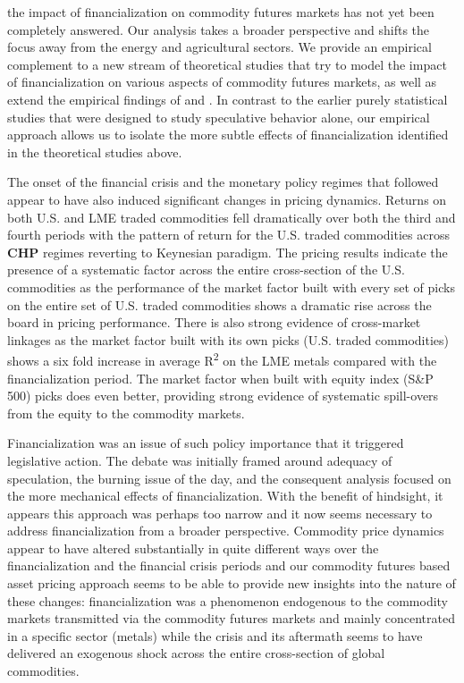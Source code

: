 \documentclass[11pt, letterpaper, doublespacing]{article}
\renewcommand{\footnote}{\endnote}
\let\rmarkdownfootnote\footnote%
\def\footnote{\protect\rmarkdownfootnote}
\begin{document}
the impact of financialization on commodity futures markets has not yet
been completely answered. Our analysis takes a broader perspective and
shifts the focus away from the energy and agricultural sectors. We
provide an empirical complement to a new stream of theoretical studies
that try to model the impact of financialization on various aspects of
commodity futures markets\footnote{\citet{etula_broker-dealer_2013},
  \citet{acharya_limits_2013}, \citet{cheng_convective_2014},
  \citet{leclercq_equilibrium_2014}, \citet{sockin_informational_2015},
  \citet{goldstein_speculation_2013},
  \citet{EkelandSpeculationcommodityfutures2016},
  \citet{goldstein_commodity_2017}.}, as well as extend the empirical
findings of \citet{basak_model_2016} and \citet{tang_index_2012}. In
contrast to the earlier purely statistical studies that were designed to
study speculative behavior alone, our empirical approach allows us to
isolate the more subtle effects of financialization identified in the
theoretical studies above.

The onset of the financial crisis and the monetary policy regimes that
followed appear to have also induced significant changes in pricing
dynamics. Returns on both U.S. and LME traded commodities fell
dramatically over both the third and fourth periods with the pattern of
return for the U.S. traded commodities across \(\mathbf{CHP}\) regimes
reverting to Keynesian paradigm. The pricing results indicate the
presence of a systematic factor across the entire cross-section of the
U.S. commodities as the performance of the market factor built with
every set of picks on the entire set of U.S. traded commodities shows a
dramatic rise across the board in pricing performance. There is also
strong evidence of cross-market linkages as the market factor built with
its own picks (U.S. traded commodities) shows a six fold increase in
average R\textsuperscript{2} on the LME metals compared with the
financialization period. The market factor when built with equity index
(S\&P 500) picks does even better, providing strong evidence of
systematic spill-overs from the equity to the commodity markets.

Financialization was an issue of such policy importance that it
triggered legislative action. The debate was initially framed around
adequacy of speculation, the burning issue of the day, and the
consequent analysis focused on the more mechanical effects of
financialization. With the benefit of hindsight, it appears this
approach was perhaps too narrow and it now seems necessary to address
financialization from a broader perspective. Commodity price dynamics
appear to have altered substantially in quite different ways over the
financialization and the financial crisis periods and our commodity
futures based asset pricing approach seems to be able to provide new
insights into the nature of these changes: financialization was a
phenomenon endogenous to the commodity markets transmitted via the
commodity futures markets and mainly concentrated in a specific sector
(metals) while the crisis and its aftermath seems to have delivered an
exogenous shock across the entire cross-section of global commodities.
\end{document}
